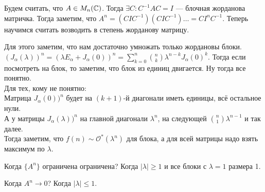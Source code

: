 Будем считать, что  $A \in M_{n}(\mathbb{C})$. Тогда  $\exists C\!: C^{-1}AC = I$ --- блочная жорданова матричка. Тогда заметим, что  $A^n = (CIC^{-1})(CIC^{-1})\ldots = CI^nC^{-1}$. Теперь научимся считать возводить в степень жорданову матрицу.

Для этого заметим, что нам достаточно умножать только жордановы блоки. $(J_\alpha(\lambda))^n = (\lambda E_{\alpha} + J_\alpha(0))^n = \sum\limits_{k=0}^n \binom{n}{k} \lambda^{n-k}J_\alpha(0)^k$. Тогда если посмотреть на блок, то заметим, что блок из единиц двигается. Ну тогда все понятно.\\
Для тех, кому не понятно:\\
Матрица $J_\alpha(0))^n$ будет на $(k+1)$-й диагонали иметь единицы, всё остальное нули.\\
А у матрицы $J_\alpha(\lambda))^n$ на главной диагонали $\lambda^n$, на следующей $\binom{n}{1} \lambda^{n-1}$ и так далее.\\

Тогда заметим, что $f(n) \sim \mathcal{O}^*(\lambda^n)$ для блока, а для всей матрицы надо взять максимум  по  $\lambda$.

Когда  $\{A^n\}$ ограничена ограничена? Когда  $|\lambda| \ge 1$ и все блоки с $\lambda = 1$ размера 1.

Когда  $A^n \to 0$? Когда  $|\lambda| \le 1$.

